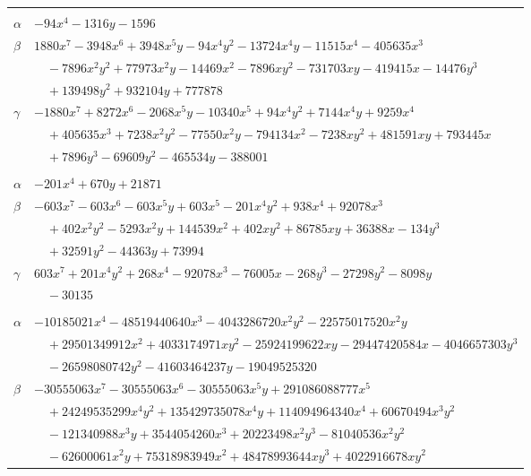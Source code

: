 \documentclass[11pt]{article}
\begin{document}
\begin{longtable}{@{}ll@{}}
\addlinespace[3pt]
\multicolumn{2}{@{}l}{$\{i,j\}=\{35,104\}$, $k_{ij}=2^{3}\cdot 5\cdot 7$}\\
$\alpha$ & $-94x^{4}-1316y-1596$\\
$\beta$ & $1880x^{7}-3948x^{6}+3948x^{5}y-94x^{4}y^{2}-13724x^{4}y-11515x^{4}-405635x^{3}$\\
 & $\quad -7896x^{2}y^{2}+77973x^{2}y-14469x^{2}-7896xy^{2}-731703xy-419415x-14476y^{3}$\\
 & $\quad +139498y^{2}+932104y+777878$\\
$\gamma$ & $-1880x^{7}+8272x^{6}-2068x^{5}y-10340x^{5}+94x^{4}y^{2}+7144x^{4}y+9259x^{4}$\\
 & $\quad +405635x^{3}+7238x^{2}y^{2}-77550x^{2}y-794134x^{2}-7238xy^{2}+481591xy+793445x$\\
 & $\quad +7896y^{3}-69609y^{2}-465534y-388001$\\
\addlinespace[3pt]
\multicolumn{2}{@{}l}{$\{i,j\}=\{35,105\}$, $k_{ij}=2^{4}\cdot 3^{2}\cdot 5^{3}\cdot 7$}\\
$\alpha$ & $-201x^{4}+670y+21871$\\
$\beta$ & $-603x^{7}-603x^{6}-603x^{5}y+603x^{5}-201x^{4}y^{2}+938x^{4}+92078x^{3}$\\
 & $\quad +402x^{2}y^{2}-5293x^{2}y+144539x^{2}+402xy^{2}+86785xy+36388x-134y^{3}$\\
 & $\quad +32591y^{2}-44363y+73994$\\
$\gamma$ & $603x^{7}+201x^{4}y^{2}+268x^{4}-92078x^{3}-76005x-268y^{3}-27298y^{2}-8098y$\\
 & $\quad -30135$\\
\addlinespace[3pt]
\multicolumn{2}{@{}l}{$\{i,j\}=\{35,106\}$, $k_{ij}=2\cdot 3$}\\
$\alpha$ & $-10185021x^{4}-48519440640x^{3}-4043286720x^{2}y^{2}-22575017520x^{2}y$\\
 & $\quad +29501349912x^{2}+4033174971xy^{2}-25924199622xy-29447420584x-4046657303y^{3}$\\
 & $\quad -26598080742y^{2}-41603464237y-19049525320$\\
$\beta$ & $-30555063x^{7}-30555063x^{6}-30555063x^{5}y+291086088777x^{5}$\\
 & $\quad +24249535299x^{4}y^{2}+135429735078x^{4}y+114094964340x^{4}+60670494x^{3}y^{2}$\\
 & $\quad -121340988x^{3}y+3544054260x^{3}+20223498x^{2}y^{3}-81040536x^{2}y^{2}$\\
 & $\quad -62600061x^{2}y+75318983949x^{2}+48478993644xy^{3}+4022916678xy^{2}$\\

\end{longtable}
\end{document}
